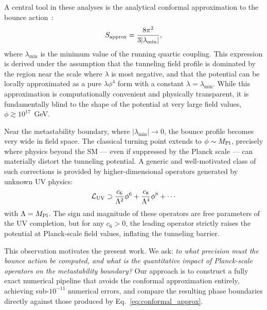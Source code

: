 \documentclass[aps,prd,twocolumn,superscriptaddress,nofootinbib]{revtex4-2}
\begin{document}
A central tool in these analyses is the analytical conformal approximation
to the bounce action~\cite{Isidori:2001bm}:
\begin{equation}
    S_{\rm approx} = \frac{8\pi^2}{3|\lambda_{\min}|},
    \label{eq:conformal_approx}
\end{equation}
where $\lambda_{\min}$ is the minimum value of the running quartic coupling.
This expression is derived under the assumption that the tunneling field
profile is dominated by the region near the scale where $\lambda$ is most
negative, and that the potential can be locally approximated as a pure
$\lambda \phi^4$ form with a constant $\lambda = \lambda_{\min}$. While
this approximation is computationally convenient and physically transparent,
it is fundamentally blind to the shape of the potential at very large field
values, $\phi \gtrsim 10^{17}$~GeV.

Near the metastability boundary, where $|\lambda_{\min}| \to 0$, the bounce
profile becomes very wide in field space. The classical turning point extends
to $\phi \sim M_{\rm Pl}$, precisely where physics beyond the SM — even if
suppressed by the Planck scale — can materially distort the tunneling
potential. A generic and well-motivated class of such corrections is provided
by higher-dimensional operators generated by unknown UV physics:
\begin{equation}
    \mathcal{L}_{\rm UV} \supset \frac{c_6}{\Lambda^2} \phi^6
    + \frac{c_8}{\Lambda^4} \phi^8 + \cdots
    \label{eq:eft_expansion}
\end{equation}
with $\Lambda = M_{\rm Pl}$. The sign and magnitude of these operators are
free parameters of the UV completion, but for any $c_6 > 0$, the leading
operator strictly raises the potential at Planck-scale field values, inflating
the tunneling barrier.

This observation motivates the present work. We ask: \textit{to what precision
must the bounce action be computed, and what is the quantitative impact of
Planck-scale operators on the metastability boundary?} Our approach is to
construct a fully exact numerical pipeline that avoids the conformal
approximation entirely, achieving sub-$10^{-11}$ numerical errors, and
compare the resulting phase boundaries directly against those produced by
Eq.~\eqref{eq:conformal_approx}.
\end{document}
